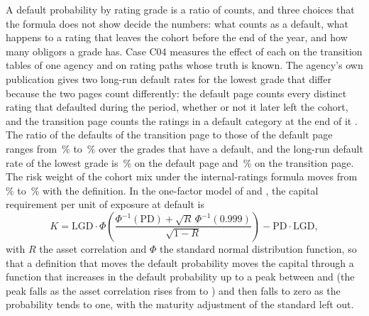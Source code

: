 A default probability by rating grade is a ratio of counts, and three choices that the formula does not show decide the numbers: what counts as
a default, what happens to a rating that leaves the cohort before the end of the year, and how many obligors a grade has. Case C04 measures the
effect of each on the transition tables of one agency and on rating paths whose truth is known. The agency's own publication gives two long-run
default rates for the lowest grade that differ because the two pages count differently: the default page counts every distinct rating that defaulted
during the period, whether or not it later left the cohort, and the transition page counts the ratings in a default category at the end of it \citep{ratings:cerep}.
The ratio of the defaults of the transition page to those of the default page ranges from \pxFourGapMin{}\,\% to \pxFourGapMax{}\,\% over the grades that have
a default, and the long-run default rate of the lowest grade is \pxOneRegCerepLong{}\,\% on the default page and \pxOneRegTransLong{}\,\% on the transition page. The
risk weight of the cohort mix under the internal-ratings formula moves from \pxFourRwBefore{}\,\% to \pxFourRwAfter{}\,\% with the definition. In the
one-factor model of \citet{ratings:vasicek2002} and \citet{ratings:gordy2003}, the capital requirement per unit of exposure at default is
\begin{equation}
K=\mathrm{LGD}\cdot\Phi\!\left(\frac{\Phi^{-1}(\mathrm{PD})+\sqrt{R}\,\Phi^{-1}(0.999)}{\sqrt{1-R}}\right)-\mathrm{PD}\cdot\mathrm{LGD},
\label{eq:bs4-irb}
\end{equation}
with $R$ the asset correlation and $\Phi$ the standard normal distribution function, so that a definition that moves the default probability moves the
capital through a function that increases in the default probability up to a peak between \pxFourIrbPeakLow{} and \pxFourIrbPeakHigh{} (the peak falls as the asset correlation rises from \pxFourIrbRhoLow{} to \pxFourIrbRhoHigh{}) and then falls to zero as the probability tends to one, with the maturity adjustment of the standard left out.

